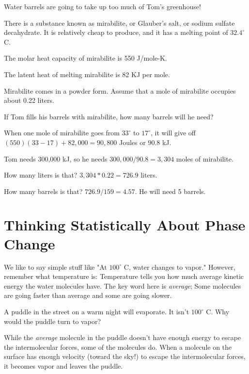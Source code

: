 \begin{Exercise}[title={Using Mirabilite For Thermal Energy Storage}, label=mirabilite]

Water barrels are going to take up too much of Tom's greenhouse!

There is a substance known as mirabilite, or Glauber's salt,  or sodium sulfate decahydrate.  It is relatively cheap to produce, and it has a melting point of $32.4^\circ$ C.

The molar heat capacity of mirabilite is 550 J/mole-K.

The latent heat of melting mirabilite is 82 KJ per mole.

Mirabilite comes in a powder form.  Assume that a mole of mirabilite occupies about 0.22 liters.

If Tom fills his barrels with mirabilite,  how many barrels will he need?

\end{Exercise}
\begin{Answer}[ref=mirabilite] 

When one mole of mirabilite goes from $33^\circ$ to $17^\circ$,  it will give off $(550)(33-17) + 82,000 = 90,800$ Joules or $90.8$ kJ. 

Tom needs 300,000 kJ,  so he needs $300,000/90.8 =   3,304$ moles of mirabilite.

How many liters is that?  $3,304 * 0.22 = 726.9$ liters.

How many barrels is that? $726.9 / 159 = 4.57$.  He will need 5 barrels.
  
\end{Answer}

\section{Thinking Statistically About Phase Change}

We like to say simple stuff like "At $100^\circ$ C,  water changes to vapor." However,  remember what
temperature is: Temperature tells you how much average kinetic energy the water molecules have.   The key word here is \emph{average}; Some molecules are going faster than average and some are going slower.

A puddle in the street on a warm night will evaporate.   It isn't  $100^\circ$ C.  Why would the puddle turn to vapor?

While the \emph{average} molecule in the puddle doesn't have enough energy to escape the intermolecular forces,  some of the molecules do.  When a molecule on the surface has enough velocity (toward the sky!) to escape the intermolecular forces,  it becomes vapor and leaves the puddle.

